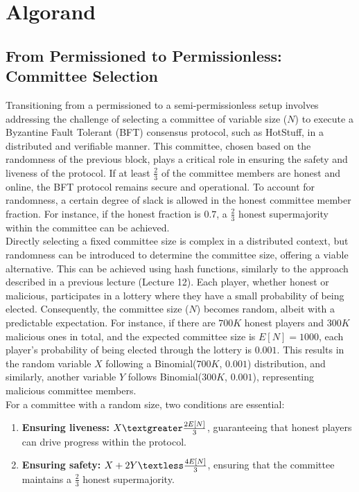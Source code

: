 \chapter{Algorand}
\section{From Permissioned to Permissionless: Committee Selection}
Transitioning from a permissioned to a semi-permissionless setup involves addressing the challenge of selecting a committee of variable size ($N$) to execute a Byzantine Fault Tolerant (BFT) consensus protocol, such as HotStuff, in a distributed and verifiable manner. This committee, chosen based on the randomness of the previous block, plays a critical role in ensuring the safety and liveness of the protocol. If at least $\frac{2}{3}$ of the committee members are honest and online, the BFT protocol remains secure and operational. To account for randomness, a certain degree of slack is allowed in the honest committee member fraction. For instance, if the honest fraction is $0.7$, a $\frac{2}{3}$ honest supermajority within the committee can be achieved.\\
Directly selecting a fixed committee size is complex in a distributed context, but randomness can be introduced to determine the committee size, offering a viable alternative. This can be achieved using hash functions, similarly to the approach described in a previous lecture (Lecture 12). Each player, whether honest or malicious, participates in a lottery where they have a small probability of being elected. Consequently, the committee size ($N$) becomes random, albeit with a predictable expectation. For instance, if there are $700K$ honest players and $300K$ malicious ones in total, and the expected committee size is $E[N] = 1000$, each player's probability of being elected through the lottery is $0.001$. This results in the random variable $X$ following a Binomial($700K$, $0.001$) distribution, and similarly, another variable $Y$ follows Binomial($300K$, $0.001$), representing malicious committee members.\\
For a committee with a random size, two conditions are essential: 
\begin{enumerate}
	\item \textbf{Ensuring liveness:} $X \textgreater \frac{2E[N]}{3}$, guaranteeing that honest players can drive progress within the protocol.
	\item \textbf{Ensuring safety:}  $X + 2Y \textless \frac{4E[N]}{3}$, ensuring that the committee maintains a $\frac{2}{3}$ honest supermajority.
\end{enumerate}
